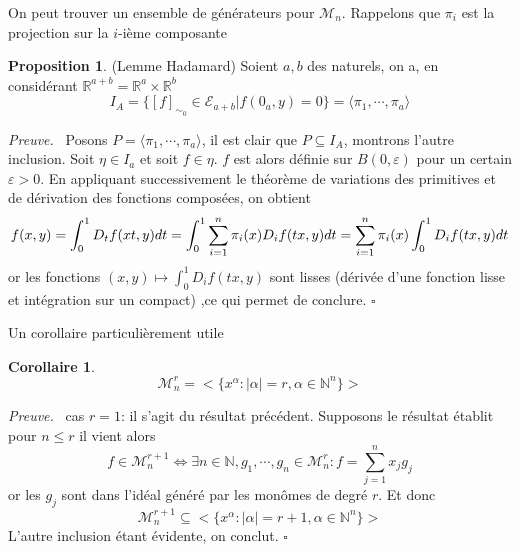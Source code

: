 \documentclass[a4paper,12pt,oneside,titlepage]{article}
\newcommand{\R}[0]{\mathbb{R}}
\theoremstyle{definition}
\newtheorem{proposition}[definition]{Proposition}
\theoremstyle{plain}
\newtheorem{corollaire}[definition]{Corollaire}
\newenvironment{preuve}
{\par\noindent\textit{Preuve.}\ }
{\hfill$\square$\par}
\begin{document}
On peut trouver un ensemble de générateurs pour $\mathcal{M}_n$. Rappelons que $\pi_i$ est la projection sur la $i$-ième composante
\begin{proposition}(Lemme Hadamard)
Soient $a,b$ des naturels, on a, en considérant $\R^{a+b}=\R^a\times\R^b$
    \begin{equation*}
        I_A=\{[f]_{\sim_0}\in \mathcal{E}_{a+b} | f(0_a,y)=0\}=
         \langle \pi_1,\cdots, \pi_a\rangle
    \end{equation*}
\end{proposition}
\begin{preuve}
Posons $P=\langle \pi_1,\cdots,\pi_a\rangle$, il est clair que $P\subseteq I_A$, montrons l'autre inclusion.
Soit $\eta\in I_a$ et soit $f\in\eta$. $f$ est alors définie sur $B(0,\varepsilon)$ pour un certain $ \varepsilon>0$. En appliquant successivement le théorème de variations des primitives et de dérivation des fonctions composées, on obtient
\begin{equation*}
    f(x,y)=\int_0^1 D_tf(xt,y) dt=\int_0^1\sum_{i=1}^n \pi_i(x) D_{i}f(tx,y)\space dt=\sum_{i=1}^n \pi_i(x)
    \int_0^1 D_if(tx,y) \space dt
\end{equation*}
or les fonctions $(x,y)\mapsto \int_0^1D_i f(tx,y)$ sont lisses (dérivée d'une fonction lisse et intégration sur un compact) ,ce qui permet de conclure.
\end{preuve}
Un corollaire particulièrement utile 
\begin{corollaire}
    \begin{equation*}
        \mathcal{M}_n^r=\bigg<\{x^{\alpha} :|\alpha|=r, \alpha\in\mathbb{N}^n\}\bigg>
    \end{equation*}
\end{corollaire}
\begin{preuve}
    cas $r=1$: il s'agit du résultat précédent.
    Supposons le résultat établit pour $n\leq r$ il vient alors
    \begin{equation*}
        f\in\mathcal{M}_n^{r+1}\Leftrightarrow 
        \exists n\in\mathbb{N} , g_1,\cdots,g_n \in \mathcal{M}_n^{r}: f=\sum_{j=1}^nx_j g_j
    \end{equation*}
    or les $g_j$ sont dans l'idéal généré par les monômes de degré $r$.
    Et donc
    \begin{equation*}
                \mathcal{M}_n^{r+1}\subseteq \bigg<\{x^{\alpha} :|\alpha|=r+1, \alpha\in\mathbb{N}^n\}\bigg>
    \end{equation*}
L'autre inclusion étant évidente, on conclut.
\end{preuve}
\end{document}
